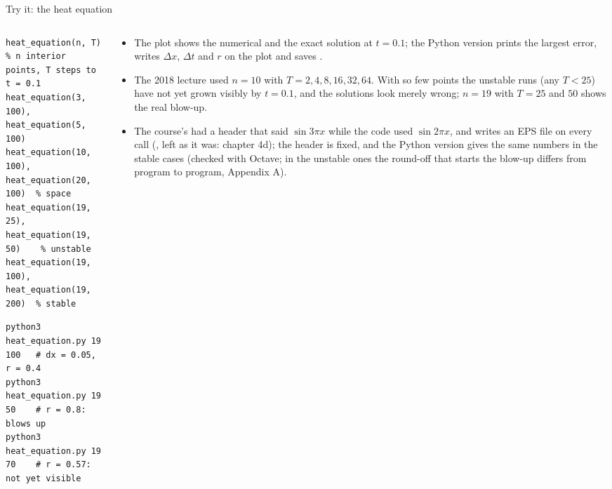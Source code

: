 \documentclass[aspectratio=169,11pt]{beamer}
\begin{document}
\begin{frame}[fragile]{Try it: the heat equation}
\begin{columns}[T,onlytextwidth]
\begin{column}{0.5\textwidth}
\begin{lstlisting}[style=matlab,basicstyle=\ttfamily\tiny\color{BlackGray}]
heat_equation(n, T)   % n interior points, T steps to t = 0.1
heat_equation(3, 100), heat_equation(5, 100)
heat_equation(10, 100), heat_equation(20, 100)  % space
heat_equation(19, 25), heat_equation(19, 50)    % unstable
heat_equation(19, 100), heat_equation(19, 200)  % stable
\end{lstlisting}
\begin{lstlisting}[style=shell,basicstyle=\ttfamily\tiny\color{BlackGray}]
python3 heat_equation.py 19 100   # dx = 0.05, r = 0.4
python3 heat_equation.py 19 50    # r = 0.8: blows up
python3 heat_equation.py 19 70    # r = 0.57: not yet visible
\end{lstlisting}
\end{column}
\begin{column}{0.48\textwidth}
\footnotesize
\begin{itemize}
  \item The plot shows the numerical and the exact solution at $t = 0.1$; the Python version prints the largest error, writes $\Delta x$, $\Delta t$ and $r$ on the plot and saves .
  \item The 2018 lecture used $n = 10$ with $T = 2, 4, 8, 16, 32, 64$. With so few points the unstable runs (any $T < 25$) have not yet grown visibly by $t = 0.1$, and the solutions look merely wrong; $n = 19$ with $T = 25$ and $50$ shows the real blow-up.
  \item The course's  had a header that said $\sin 3\pi x$ while the code used $\sin 2\pi x$, and writes an EPS file on every call (, left as it was: chapter 4d); the header is fixed, and the Python version gives the same numbers in the stable cases (checked with Octave; in the unstable ones the round-off that starts the blow-up differs from program to program, Appendix A).
\end{itemize}
\end{column}
\end{columns}
\end{frame}
\end{document}
